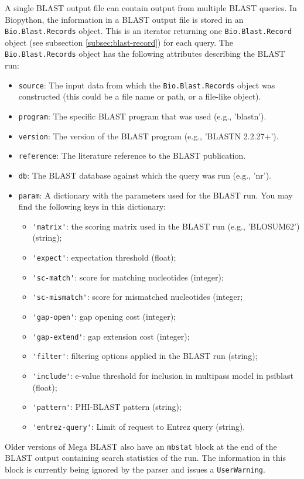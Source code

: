 A single BLAST output file can contain output from multiple BLAST queries.
In Biopython, the information in a BLAST output file is stored in an \verb|Bio.Blast.Records| object. This is an iterator returning one \verb|Bio.Blast.Record| object (see subsection \ref{subsec:blast-record}) for each query. The \verb|Bio.Blast.Records| object has the following attributes describing the BLAST run:
\begin{itemize}
\item \verb|source|: The input data from which the \verb|Bio.Blast.Records| object was constructed (this could be a file name or path, or a file-like object).
\item \verb|program|: The specific BLAST program that was used (e.g., 'blastn').
\item \verb|version|: The version of the BLAST program (e.g., 'BLASTN 2.2.27+').
\item \verb|reference|:  The literature reference to the BLAST publication.
\item \verb|db|: The BLAST database against which the query was run (e.g., 'nr').
\item \verb|param|: A dictionary with the parameters used for the BLAST run. You may find the following keys in this dictionary:
\begin{itemize}
\item \verb|'matrix'|: the scoring matrix used in the BLAST run (e.g., 'BLOSUM62') (string);
\item \verb|'expect'|: expectation threshold (float);
\item \verb|'sc-match'|: score for matching nucleotides (integer);
\item \verb|'sc-mismatch'|: score for mismatched nucleotides (integer;
\item \verb|'gap-open'|: gap opening cost (integer);
\item \verb|'gap-extend'|: gap extension cost (integer);
\item \verb|'filter'|: filtering options applied in the BLAST run (string);
\item \verb|'include'|: e-value threshold for inclusion in multipass model in psiblast (float);
\item \verb|'pattern'|: PHI-BLAST pattern (string);
\item \verb|'entrez-query'|: Limit of request to Entrez query (string).
\end{itemize}
\end{itemize}
Older versions of Mega BLAST also have an \verb|mbstat| block at the end of the BLAST output containing search statistics of the run. The information in this block is currently being ignored by the parser and issues a \verb|UserWarning|.

